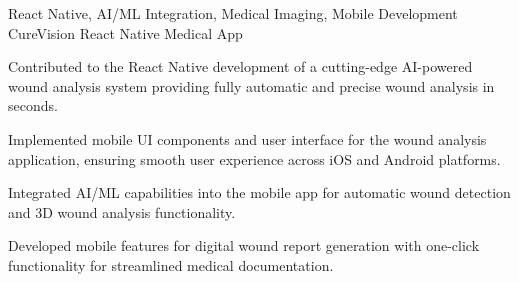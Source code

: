 \begin{cventries}
  \cventry
    {React Native, AI/ML Integration, Medical Imaging, Mobile Development} %
    {CureVision} %
    {React Native Medical App} %
    {} %
    {
      \begin{cvitems} %
        \item {Contributed to the React Native development of a cutting-edge AI-powered wound analysis system providing fully automatic and precise wound analysis in seconds.}
        \item {Implemented mobile UI components and user interface for the wound analysis application, ensuring smooth user experience across iOS and Android platforms.}
        \item {Integrated AI/ML capabilities into the mobile app for automatic wound detection and 3D wound analysis functionality.}
        \item {Developed mobile features for digital wound report generation with one-click functionality for streamlined medical documentation.}
      \end{cvitems}
    }

\end{cventries} 